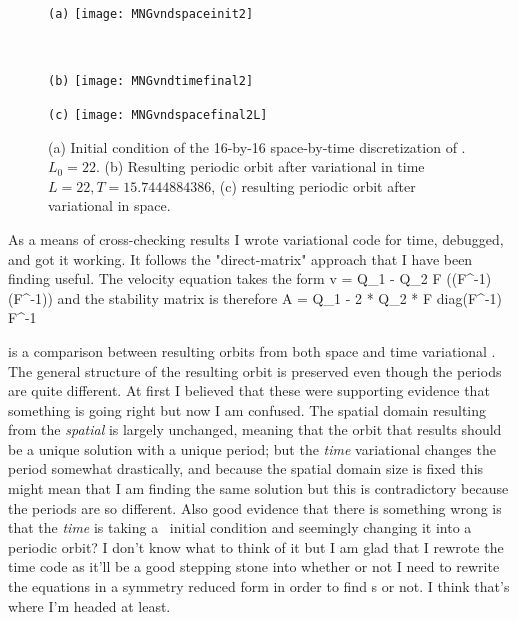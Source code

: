 \begin{figure}
\begin{minipage}[height=.32\textheight]{.45\textwidth}
\centering \small{\texttt{(a)}}
\texttt{[image: MNGvndspaceinit2]}
\end{minipage}
\\
\begin{minipage}[height=.32\textheight]{.45\textwidth}
\centering \small{\texttt{(b)}}
\texttt{[image: MNGvndtimefinal2]}
\end{minipage}
\begin{minipage}[height=.32\textheight]{.45\textwidth}
\centering \small{\texttt{(c)}}
\texttt{[image: MNGvndspacefinal2L]}
\end{minipage}
\caption{ \label{fig:MNGspaceandtime1}
(a) Initial condition of the 16-by-16 space-by-time discretization of
. $L_0 = 22$.
(b) Resulting periodic orbit after variational {\descent} in time $L =
22, T = 15.7444884386$,
(c) resulting periodic orbit after variational {\descent} in space.
}
\end{figure}

As a means of cross-checking results I wrote variational {\descent} code for time, debugged, and got it working. It follows the "direct-matrix" approach
that I have been finding useful.
The velocity equation takes the form
\beq \label{e-MNGkstimeDM}
v = Q_1 \cdot \Fu - Q_2 \cdot F \cdot ((F^{-1}\Fu) \star (F^{-1}\Fu))
\eeq
and the stability matrix is therefore
\beq
A = Q_1 - 2 * Q_2 * \cdot F \cdot diag(F^{-1}\Fu) \cdot F^{-1}
\eeq

 is a comparison between resulting orbits from both space and time variational {\descent}.
The general structure of the resulting orbit is preserved even though the periods are quite different. At first I believed that
these were supporting evidence that something is going right but now I am confused. The spatial domain resulting from the \emph{spatial}
{\descent} is largely unchanged, meaning that the orbit that results should be a unique solution with a unique period; but the \emph{time}
variational {\descent} changes the period somewhat drastically, and because the spatial domain size is fixed this might mean that I am
finding the same solution but this is contradictory because the periods are so different. Also good evidence that there is something wrong is that
the \emph{time} {\descent} is taking a \rpo\ initial condition and seemingly changing it into a periodic orbit? I don't know what
to think of it but I am glad that I rewrote the time {\descent} code as it'll be a good stepping stone into whether or not I need to rewrite the equations
in a symmetry reduced form in order to find {\rpo}s or not. I think that's where I'm headed at least.




